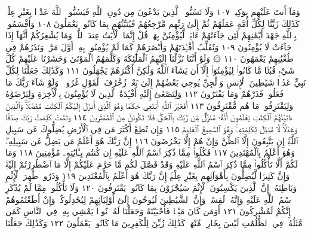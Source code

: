 وَمَآ أَنتَ عَلَيْهِم بِوَكِيلࣲ ١٠٧ وَلَا تَسُبُّوا۟ ٱلَّذِينَ يَدْعُونَ
مِن دُونِ ٱللَّهِ فَيَسُبُّوا۟ ٱللَّهَ عَدْوَۢا بِغَيْرِ عِلْمࣲۗ كَذَٰلِكَ زَيَّنَّا لِكُلِّ أُمَّةٍ
عَمَلَهُمْ ثُمَّ إِلَىٰ رَبِّهِم مَّرْجِعُهُمْ فَيُنَبِّئُهُم بِمَا كَانُوا۟ يَعْمَلُونَ ١٠٨
وَأَقْسَمُوا۟ بِٱللَّهِ جَهْدَ أَيْمَٰنِهِمْ لَئِن جَآءَتْهُمْ ءَايَةࣱ لَّيُؤْمِنُنَّ
بِهَاۚ قُلْ إِنَّمَا ٱلْأٓيَٰتُ عِندَ ٱللَّهِۖ وَمَا يُشْعِرُكُمْ أَنَّهَآ إِذَا جَآءَتْ
لَا يُؤْمِنُونَ ١٠٩ وَنُقَلِّبُ أَفْـِٔدَتَهُمْ وَأَبْصَٰرَهُمْ كَمَا لَمْ
يُؤْمِنُوا۟ بِهِۦٓ أَوَّلَ مَرَّةࣲ وَنَذَرُهُمْ فِي طُغْيَٰنِهِمْ يَعْمَهُونَ ١١٠
۞ وَلَوْ أَنَّنَا نَزَّلْنَآ إِلَيْهِمُ ٱلْمَلَٰٓئِكَةَ وَكَلَّمَهُمُ ٱلْمَوْتَىٰ وَحَشَرْنَا
عَلَيْهِمْ كُلَّ شَيْءࣲ قُبُلࣰا مَّا كَانُوا۟ لِيُؤْمِنُوٓا۟ إِلَّآ أَن يَشَآءَ ٱللَّهُ
وَلَٰكِنَّ أَكْثَرَهُمْ يَجْهَلُونَ ١١١ وَكَذَٰلِكَ جَعَلْنَا لِكُلِّ نَبِيٍّ
عَدُوࣰّا شَيَٰطِينَ ٱلْإِنسِ وَٱلْجِنِّ يُوحِي بَعْضُهُمْ إِلَىٰ بَعْضࣲ
زُخْرُفَ ٱلْقَوْلِ غُرُورࣰاۚ وَلَوْ شَآءَ رَبُّكَ مَا فَعَلُوهُۖ فَذَرْهُمْ وَمَا
يَفْتَرُونَ ١١٢ وَلِتَصْغَىٰٓ إِلَيْهِ أَفْـِٔدَةُ ٱلَّذِينَ لَا يُؤْمِنُونَ بِٱلْأٓخِرَةِ
وَلِيَرْضَوْهُ وَلِيَقْتَرِفُوا۟ مَا هُم مُّقْتَرِفُونَ ١١٣ أَفَغَيْرَ ٱللَّهِ أَبْتَغِي
حَكَمࣰا وَهُوَ ٱلَّذِيٓ أَنزَلَ إِلَيْكُمُ ٱلْكِتَٰبَ مُفَصَّلࣰاۚ
وَٱلَّذِينَ ءَاتَيْنَٰهُمُ ٱلْكِتَٰبَ يَعْلَمُونَ أَنَّهُۥ مُنَزَّلࣱ مِّن رَّبِّكَ
بِٱلْحَقِّۖ فَلَا تَكُونَنَّ مِنَ ٱلْمُمْتَرِينَ ١١٤ وَتَمَّتْ كَلِمَتُ رَبِّكَ
صِدْقࣰا وَعَدْلࣰاۚ لَّا مُبَدِّلَ لِكَلِمَٰتِهِۦۚ وَهُوَ ٱلسَّمِيعُ ٱلْعَلِيمُ ١١٥
وَإِن تُطِعْ أَكْثَرَ مَن فِي ٱلْأَرْضِ يُضِلُّوكَ عَن سَبِيلِ ٱللَّهِۚ إِن
يَتَّبِعُونَ إِلَّا ٱلظَّنَّ وَإِنْ هُمْ إِلَّا يَخْرُصُونَ ١١٦ إِنَّ رَبَّكَ هُوَ
أَعْلَمُ مَن يَضِلُّ عَن سَبِيلِهِۦۖ وَهُوَ أَعْلَمُ بِٱلْمُهْتَدِينَ ١١٧ فَكُلُوا۟
مِمَّا ذُكِرَ ٱسْمُ ٱللَّهِ عَلَيْهِ إِن كُنتُم بِـَٔايَٰتِهِۦ مُؤْمِنِينَ ١١٨
وَمَا لَكُمْ أَلَّا تَأْكُلُوا۟ مِمَّا ذُكِرَ ٱسْمُ ٱللَّهِ عَلَيْهِ وَقَدْ فَصَّلَ
لَكُم مَّا حَرَّمَ عَلَيْكُمْ إِلَّا مَا ٱضْطُرِرْتُمْ إِلَيْهِۗ وَإِنَّ كَثِيرࣰا
لَّيُضِلُّونَ بِأَهْوَآئِهِم بِغَيْرِ عِلْمٍۚ إِنَّ رَبَّكَ هُوَ أَعْلَمُ بِٱلْمُعْتَدِينَ ١١٩
وَذَرُوا۟ ظَٰهِرَ ٱلْإِثْمِ وَبَاطِنَهُۥٓۚ إِنَّ ٱلَّذِينَ يَكْسِبُونَ ٱلْإِثْمَ
سَيُجْزَوْنَ بِمَا كَانُوا۟ يَقْتَرِفُونَ ١٢٠ وَلَا تَأْكُلُوا۟ مِمَّا لَمْ
يُذْكَرِ ٱسْمُ ٱللَّهِ عَلَيْهِ وَإِنَّهُۥ لَفِسْقࣱۗ وَإِنَّ ٱلشَّيَٰطِينَ لَيُوحُونَ
إِلَىٰٓ أَوْلِيَآئِهِمْ لِيُجَٰدِلُوكُمْۖ وَإِنْ أَطَعْتُمُوهُمْ إِنَّكُمْ لَمُشْرِكُونَ ١٢١
أَوَمَن كَانَ مَيْتࣰا فَأَحْيَيْنَٰهُ وَجَعَلْنَا لَهُۥ نُورࣰا يَمْشِي بِهِۦ
فِي ٱلنَّاسِ كَمَن مَّثَلُهُۥ فِي ٱلظُّلُمَٰتِ لَيْسَ بِخَارِجࣲ مِّنْهَاۚ كَذَٰلِكَ
زُيِّنَ لِلْكَٰفِرِينَ مَا كَانُوا۟ يَعْمَلُونَ ١٢٢ وَكَذَٰلِكَ جَعَلْنَا
